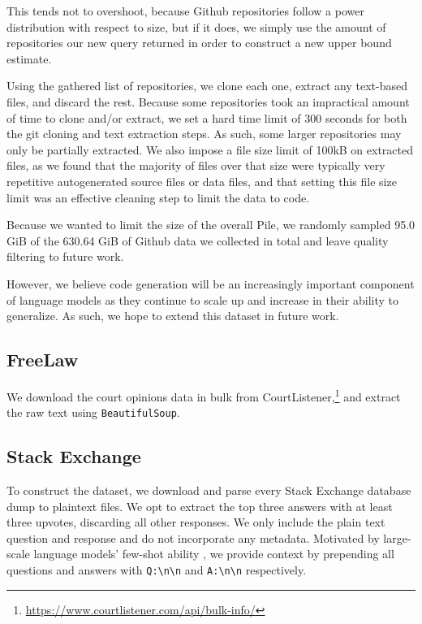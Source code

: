 \documentclass[11pt,a4paper]{article}
\begin{document}
\begin{appendices}
This tends not to overshoot, because Github repositories follow a power distribution with respect to size, but if it does, we simply use the amount of repositories our new query returned in order to construct a new upper bound estimate.

Using the gathered list of repositories, we clone each one, extract any text-based files, and discard the rest. Because some repositories took an impractical amount of time to clone and/or extract, we set a hard time limit of 300 seconds for both the git cloning and text extraction steps. As such, some larger repositories may only be partially extracted. We also impose a file size limit of 100kB on extracted files, as we found that the majority of files over that size were typically very repetitive autogenerated source files or data files, and that setting this file size limit was an effective cleaning step to limit the data to code.

Because we wanted to limit the size of the overall Pile, we randomly sampled 95.0 GiB of the 630.64 GiB of Github data we collected in total and leave quality filtering to future work. 

However, we believe code generation will be an increasingly important component of language models as they continue to scale up and increase in their ability to generalize. As such, we hope to extend this dataset in future work.



\subsection{FreeLaw}

We download the court opinions data in bulk from CourtListener,\footnote{ \url{https://www.courtlistener.com/api/bulk-info/}} and extract the raw text using \texttt{BeautifulSoup}.

\subsection{Stack Exchange}

To construct the dataset, we download and parse every Stack Exchange database dump to plaintext files. We opt to extract the top three answers with at least three upvotes, discarding all other responses. We only include the plain text question and response and do not incorporate any metadata. Motivated by large-scale language models’ few-shot ability \citep{GPT3}, we provide context by prepending all questions and answers with \texttt{Q:\textbackslash n\textbackslash n} and \texttt{A:\textbackslash n\textbackslash n} respectively. 


\end{appendices}
\end{document}
